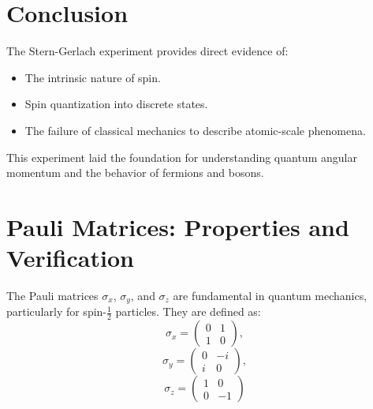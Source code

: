\documentclass[a4paper,12pt]{article}
\begin{document}
\begin{multicols}{2}
\section*{Conclusion}
The Stern-Gerlach experiment provides direct evidence of:
\begin{itemize}
    \item The intrinsic nature of spin.
    \item Spin quantization into discrete states.
    \item The failure of classical mechanics to describe atomic-scale phenomena.
\end{itemize}
This experiment laid the foundation for understanding quantum angular momentum and the behavior of fermions and bosons.

\section*{Pauli Matrices: Properties and Verification}
The Pauli matrices $\sigma_x$, $\sigma_y$, and $\sigma_z$ are fundamental in quantum mechanics, particularly for spin-$\frac{1}{2}$ particles. They are defined as:
\[
\sigma_x = \begin{pmatrix} 0 & 1 \\ 1 & 0 \end{pmatrix},
\]
\[
\sigma_y = \begin{pmatrix} 0 & -i \\ i & 0 \end{pmatrix}, 
\]
\[
\sigma_z = \begin{pmatrix} 1 & 0 \\ 0 & -1 \end{pmatrix}
\]


\end{multicols}
\end{document}
